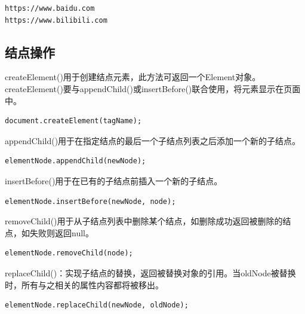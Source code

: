 \begin{tcolorbox}
	\begin{verbatim}
https://www.baidu.com
https://www.bilibili.com
	\end{verbatim}
\end{tcolorbox}

\vspace{0.5cm}

\subsection{结点操作}

createElement()用于创建结点元素，此方法可返回一个Element对象。\\

createElement()要与appendChild()或insertBefore()联合使用，将元素显示在页面中。\\

\begin{lstlisting}[style=htmlcssjs]
document.createElement(tagName);
\end{lstlisting}

appendChild()用于在指定结点的最后一个子结点列表之后添加一个新的子结点。\\

\begin{lstlisting}[style=htmlcssjs]
elementNode.appendChild(newNode);
\end{lstlisting}

insertBefore()用于在已有的子结点前插入一个新的子结点。\\

\begin{lstlisting}[style=htmlcssjs]
elementNode.insertBefore(newNode, node);
\end{lstlisting}

removeChild()用于从子结点列表中删除某个结点，如删除成功返回被删除的结点，如失败则返回null。\\

\begin{lstlisting}[style=htmlcssjs]
elementNode.removeChild(node);
\end{lstlisting}

replaceChild()：实现子结点的替换，返回被替换对象的引用。当oldNode被替换时，所有与之相关的属性内容都将被移出。\\

\begin{lstlisting}[style=htmlcssjs]
elementNode.replaceChild(newNode, oldNode);
\end{lstlisting}